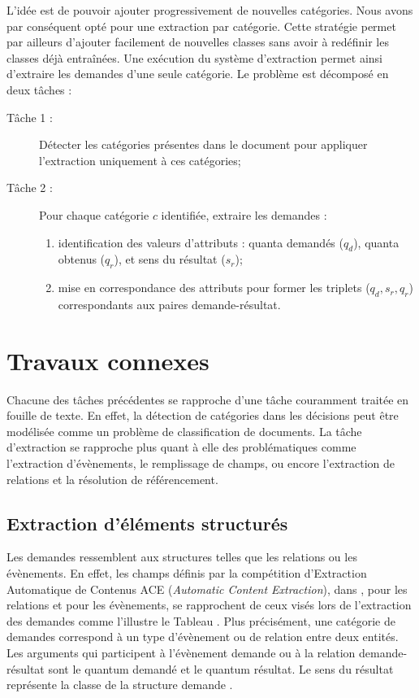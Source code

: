  L'idée est de pouvoir ajouter progressivement de nouvelles catégories. Nous avons par conséquent opté pour une extraction par catégorie. Cette stratégie permet par ailleurs d'ajouter facilement de nouvelles classes sans avoir à redéfinir les classes déjà entraînées. Une exécution du système d'extraction permet ainsi d'extraire les demandes d'une seule catégorie. Le problème est décomposé en deux tâches :
\begin{description}
	\item[Tâche 1 :] Détecter les catégories présentes dans le document pour appliquer l'extraction uniquement à ces catégories;
	\item[Tâche 2 :] Pour chaque catégorie $c$ identifiée, extraire les demandes :
	\begin{enumerate}
		\item identification des valeurs d'attributs : quanta demandés ($q_d$), quanta obtenus ($q_r$), et sens du résultat ($s_r$);
		\item mise en correspondance des attributs pour former les triplets ($q_d, s_r, q_r$) correspondants aux paires demande-résultat.
	\end{enumerate}
\end{description}

 
\section{Travaux connexes}
\label{sec:quanta:biblio}
Chacune des tâches précédentes se rapproche d'une tâche couramment traitée en fouille de texte. En effet, la détection de catégories dans les décisions peut être modélisée comme un problème de classification de documents. La tâche d'extraction se rapproche plus quant à elle des problématiques comme l'extraction d'évènements, le remplissage de champs, ou encore l'extraction de relations et la résolution de référencement.

\subsection{Extraction d'éléments structurés}%

Les demandes ressemblent aux structures telles que les relations ou les évènements. En effet, les champs définis par la compétition d'Extraction Automatique de Contenus ACE (\textit{Automatic Content Extraction}), dans \citet{ace2005relation}, pour les relations et \citet{ace2005event} pour les évènements, se rapprochent de ceux visés lors de l'extraction des demandes comme l'illustre le Tableau . Plus précisément, une catégorie de demandes correspond à un type d'évènement ou de relation entre deux entités. Les arguments qui participent à l'évènement \og demande \fg{} ou à la relation \og demande-résultat \fg{} sont le quantum demandé et le quantum résultat. Le sens du résultat représente la classe de la structure \og demande \fg{}.

